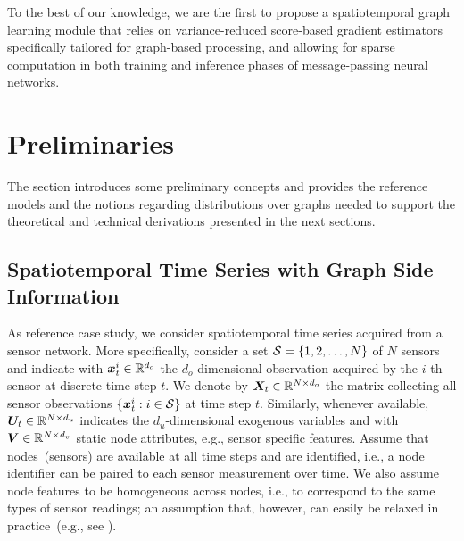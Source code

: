 To the best of our knowledge, we are the first to propose a spatiotemporal graph learning module that relies on variance-reduced score-based gradient estimators specifically tailored for graph-based processing, and allowing for sparse computation in both training and inference phases of message-passing neural networks.


\section{Preliminaries}\label{s:prelim}

The section introduces some preliminary concepts and provides the reference models and the notions regarding distributions over graphs needed to support the theoretical and technical derivations presented in the next sections.

\subsection{Spatiotemporal Time Series with Graph Side Information}\label{s:prelim-graphs}

As reference case study, we consider spatiotemporal time series acquired from a sensor network. 
More specifically, consider a set $\mathcal{S}=\{1,2,\dots,N\}$ of $N$ sensors and indicate with ${\bm{x}}_t^i \in {\mathbb{R}}^{d_o}$ the $d_o$-dimensional observation acquired by the $i$-th sensor at discrete time step $t$.
We denote by ${\bm{X}}_t \in {\mathbb{R}}^{N\times d_o}$ the matrix collecting all sensor observations $\{{\bm{x}}_t^i:i\in\mathcal{S}\}$ at time step $t$. Similarly, whenever available, ${\bm{U}}_t \in {\mathbb{R}}^{N\times d_u}$ indicates the $d_u$-dimensional exogenous variables and with ${\bm{V}} \in {\mathbb{R}}^{N\times d_v}$ static node attributes, e.g., sensor specific features. 
Assume that nodes~(sensors) are available at all time steps and are identified, i.e., a node identifier can be paired to each sensor measurement over time. We also assume node features to be homogeneous across nodes, i.e., to correspond to the same types of sensor readings; an assumption that, however, can easily be relaxed in practice~(e.g., see \citealt{schlichtkrull2018modeling}).

